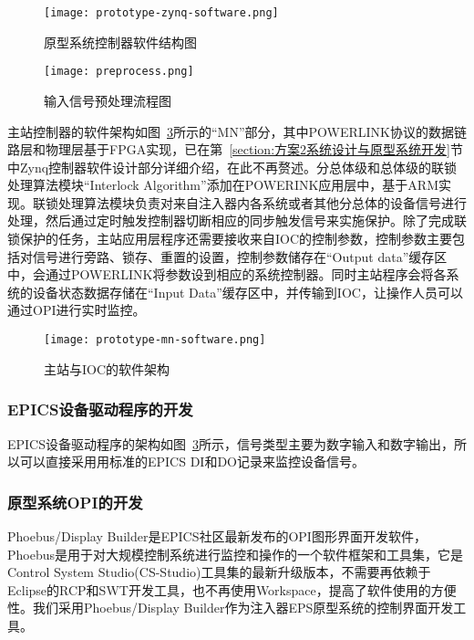 \begin{figure}[!htb]
	\centering
	\texttt{[image: prototype-zynq-software.png]}
	\caption{原型系统控制器软件结构图}
	\label{fig:prototype-zynq-software}
\end{figure}

\begin{figure}[!htb]
	\centering
	\texttt{[image: preprocess.png]}
	\caption{输入信号预处理流程图}
	\label{fig:preprocess}
\end{figure}

主站控制器的软件架构如图~\ref{fig:prototype-mn-software}所示的“MN”部分，其中POWERLINK协议的数据链路层和物理层基于FPGA实现，已在第~\ref{section:方案2系统设计与原型系统开发}节中Zynq控制器软件设计部分详细介绍，在此不再赘述。分总体级和总体级的联锁处理算法模块“Interlock Algorithm”添加在POWERINK应用层中，基于ARM实现。联锁处理算法模块负责对来自注入器内各系统或者其他分总体的设备信号进行处理，然后通过定时触发控制器切断相应的同步触发信号来实施保护。除了完成联锁保护的任务，主站应用层程序还需要接收来自IOC的控制参数，控制参数主要包括对信号进行旁路、锁存、重置的设置，控制参数储存在“Output data”缓存区中，会通过POWERLINK将参数设到相应的系统控制器。同时主站程序会将各系统的设备状态数据存储在“Input Data”缓存区中，并传输到IOC，让操作人员可以通过OPI进行实时监控。

\begin{figure}[!htb]
	\centering
	\texttt{[image: prototype-mn-software.png]}
	\caption{主站与IOC的软件架构}
	\label{fig:prototype-mn-software}
\end{figure}

\subsubsection{EPICS设备驱动程序的开发}
EPICS设备驱动程序的架构如图~\ref{fig:prototype-mn-software}所示，信号类型主要为数字输入和数字输出，所以可以直接采用用标准的EPICS DI和DO记录来监控设备信号。

\subsubsection{原型系统OPI的开发}

Phoebus/Display Builder是EPICS社区最新发布的OPI图形界面开发软件，Phoebus是用于对大规模控制系统进行监控和操作的一个软件框架和工具集，它是Control System Studio(CS-Studio)工具集的最新升级版本，不需要再依赖于Eclipse的RCP和SWT开发工具，也不再使用Workspace，提高了软件使用的方便性。我们采用Phoebus/Display Builder作为注入器EPS原型系统的控制界面开发工具。

